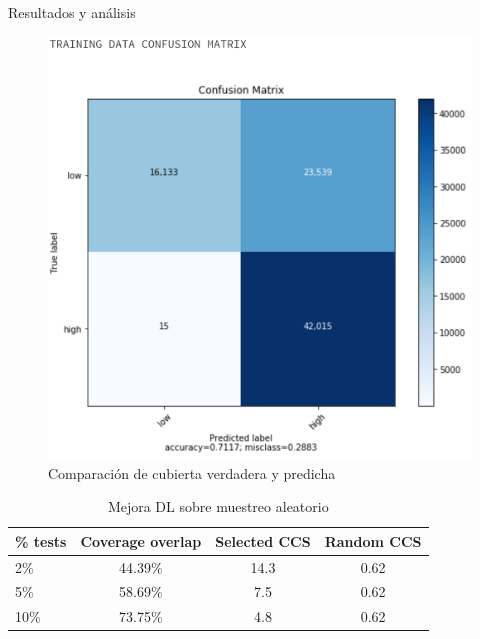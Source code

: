 \documentclass[final]{beamer}
\newlength{\onecolwid}
\begin{document}
\begin{frame}[t]
\begin{columns}[t]
\begin{column}{\onecolwid}
\begin{block}{Resultados y análisis}
    \vspace{0.5cm}
    \begin{figure}
    \includegraphics[trim={0 0 0 2cm},clip,scale=0.5]{Imagen2m.PNG}
    \caption{Comparación de cubierta verdadera y predicha}
    \end{figure}

    \begin{table}
        \centering
        \begin{tabular}{|l|c|c|c|}
            \hline
            \% tests & Coverage overlap & Selected CCS & Random CCS\\
            \hline
            2\%  &44.39\% &14.3 & 0.62 \\
            \hline
            5\% & 58.69\% &7.5 & 0.62 \\
            \hline
            10\%  &73.75\% &4.8 & 0.62 \\
            \hline
            \end{tabular}
        \caption{Mejora DL sobre muestreo aleatorio}
    \end{table}    
    

\end{block}




\end{column}
\end{columns}
\end{frame}
\end{document}
